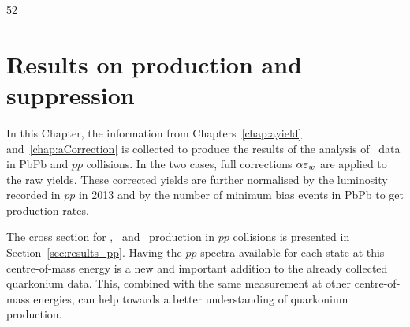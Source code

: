 52\chapter{Results on \texorpdfstring{\PgU}{Y} production and suppression}
\label{chap:aupsilon}
\minitoc







In this Chapter, the information from Chapters~\ref{chap:ayield}
and~\ref{chap:aCorrection} is collected to produce the results of the
analysis of \PgU\ data in PbPb and $pp$ collisions. In the two cases, full
corrections $\alpha\varepsilon_{w}$ are applied to the raw yields. These corrected yields are
further normalised by the luminosity recorded in $pp$ in 2013 and by the number of minimum bias events in PbPb to get production rates. 

The cross section for \PgUa, \PgUb\ and \PgUc\ production in $pp$ collisions is presented
 in Section~\ref{sec:results_pp}.
Having the $pp$ spectra available for each state at this centre-of-mass
energy is a new and important addition to the already collected
quarkonium data. This, combined with the same measurement at other
centre-of-mass energies, can help towards a better understanding of quarkonium
production. %

